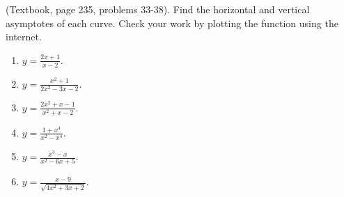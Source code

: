 \begin{problem}(Textbook, page 235, problems 33-38).
Find the horizontal and vertical asymptotes of each curve. Check your work by plotting the function using the internet.
\begin{multicols}{3}
\begin{enumerate}
\item $y=\frac{2x+1}{x-2}$.
\item $y=\frac{x^2+1}{2x^2-3x-2}$.
\item $y=\frac{2x^2+x-1}{x^2+x-2}$.
\item $y=\frac{1+x^4}{x^2-x^4}$.
\item $y=\frac{x^3-x}{x^2-6x+5}$.
\item $y=\frac{x-9}{\sqrt{4x^2+3x+2}}$.
\end{enumerate}
\end{multicols}
\end{problem}